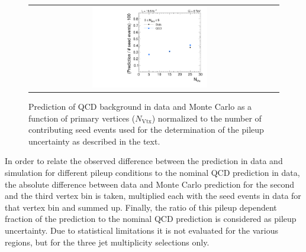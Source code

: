 \begin{figure}[!t]
  \centering
  \begin{tabular}{cc}
                \includegraphics[width=0.49\textwidth]{figures/PUUncertainty_NJet3_5.pdf}%
  \end{tabular}
  \caption{Prediction of QCD background in data and Monte Carlo as a function of primary vertices ($N_\mathrm{Vtx}$) normalized to the number of contributing seed events used for the determination of the pileup uncertainty as described in the text.}
  \label{fig:qcd_rs_pileup}
\end{figure}
In order to relate the observed difference between the prediction in data and simulation for different pileup conditions to the nominal QCD prediction in data, the absolute difference between data and Monte Carlo prediction for the second and the third vertex bin is taken, multiplied each with the seed events in data for that vertex bin and summed up.  %
Finally, the ratio of this pileup dependent fraction of the prediction to the nominal QCD prediction is considered as pileup uncertainty. Due to statistical limitations it is not evaluated for the various \HT regions, but for the three jet multiplicity selections only. 

